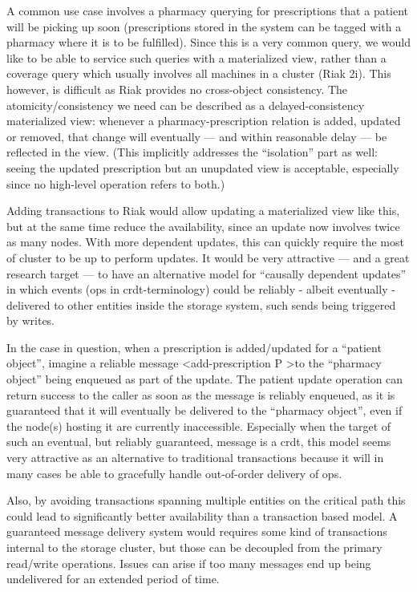 \documentclass[11pt,a4paper]{report}
\begin{document}
A common use case involves a pharmacy querying for prescriptions that a patient will be picking up soon (prescriptions stored in the system can be tagged with a pharmacy where it is to be fulfilled). Since this is a very common query, we would like to be able to service such queries with a materialized view, rather than a coverage query which usually involves all machines in a cluster (Riak 2i). This however, is difficult as Riak provides no cross-object consistency.
The atomicity/consistency we need can be described as a delayed-consistency materialized view: whenever a pharmacy-prescription relation is added, updated or removed, that change will eventually — and within reasonable delay — be reflected in the view.
(This implicitly addresses the ``isolation'' part as well: seeing the updated prescription but an unupdated view is acceptable, especially since no high-level operation refers to both.)

Adding transactions to Riak would allow updating a materialized view like this, but at the same time reduce the availability, since an update now involves twice as many nodes. With more dependent updates, this can quickly require the most of cluster to be up to perform updates.
It would be very attractive — and a great research target — to have an alternative model for ``causally dependent updates'' in which events (ops in \gls{crdt}-terminology) could be reliably - albeit eventually - delivered to other entities inside the storage system, such sends being triggered by writes.

In the case in question, when a prescription is added/updated for a ``patient object'', imagine a reliable message  \textless add-prescription P \textgreater to the ``pharmacy object'' being enqueued as part of the update. The patient update operation can return success to the caller as soon as the message is reliably enqueued, as it is guaranteed that it will eventually be delivered to the ``pharmacy object'', even if the node(s) hosting it are currently inaccessible. Especially when the target of such an eventual, but reliably guaranteed, message is a \gls{crdt}, this model seems very attractive as an alternative to traditional transactions because it will in many cases be able to gracefully handle out-of-order delivery of ops.
  
Also, by avoiding transactions spanning multiple entities on the critical path this could lead to significantly better availability than a transaction based model.
A guaranteed message delivery system would requires some kind of transactions internal to the storage cluster, but those can be decoupled from the primary read/write operations. Issues can arise if too many messages end up being undelivered for an extended period of time.
\end{document}
